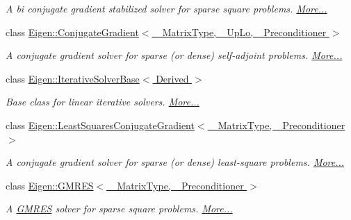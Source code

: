 \begin{DoxyCompactItemize}
\begin{DoxyCompactList}\small\item\em A bi conjugate gradient stabilized solver for sparse square problems.  \hyperlink{group___iterative_linear_solvers___module_class_eigen_1_1_bi_c_g_s_t_a_b}{More...}\end{DoxyCompactList}\item 
class \hyperlink{group___iterative_linear_solvers___module_class_eigen_1_1_conjugate_gradient}{Eigen\+::\+Conjugate\+Gradient$<$ \+\_\+\+Matrix\+Type, \+\_\+\+Up\+Lo, \+\_\+\+Preconditioner $>$}
\begin{DoxyCompactList}\small\item\em A conjugate gradient solver for sparse (or dense) self-\/adjoint problems.  \hyperlink{group___iterative_linear_solvers___module_class_eigen_1_1_conjugate_gradient}{More...}\end{DoxyCompactList}\item 
class \hyperlink{group___iterative_linear_solvers___module_class_eigen_1_1_iterative_solver_base}{Eigen\+::\+Iterative\+Solver\+Base$<$ Derived $>$}
\begin{DoxyCompactList}\small\item\em Base class for linear iterative solvers.  \hyperlink{group___iterative_linear_solvers___module_class_eigen_1_1_iterative_solver_base}{More...}\end{DoxyCompactList}\item 
class \hyperlink{group___iterative_linear_solvers___module_class_eigen_1_1_least_squares_conjugate_gradient}{Eigen\+::\+Least\+Squares\+Conjugate\+Gradient$<$ \+\_\+\+Matrix\+Type, \+\_\+\+Preconditioner $>$}
\begin{DoxyCompactList}\small\item\em A conjugate gradient solver for sparse (or dense) least-\/square problems.  \hyperlink{group___iterative_linear_solvers___module_class_eigen_1_1_least_squares_conjugate_gradient}{More...}\end{DoxyCompactList}\item 
class \hyperlink{group___iterative_linear_solvers___module_class_eigen_1_1_g_m_r_e_s}{Eigen\+::\+G\+M\+R\+E\+S$<$ \+\_\+\+Matrix\+Type, \+\_\+\+Preconditioner $>$}
\begin{DoxyCompactList}\small\item\em A \hyperlink{group___iterative_linear_solvers___module_class_eigen_1_1_g_m_r_e_s}{G\+M\+R\+ES} solver for sparse square problems.  \hyperlink{group___iterative_linear_solvers___module_class_eigen_1_1_g_m_r_e_s}{More...}\end{DoxyCompactList}\item 

\end{DoxyCompactItemize}
